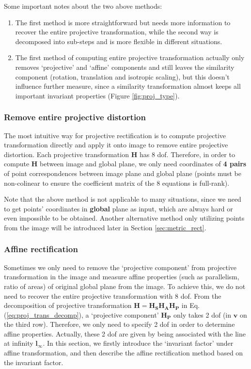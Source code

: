 \documentclass[12pt]{article}
\numberwithin{equation}{section}
\begin{document}
Some important notes about the two above methods:
\begin{enumerate}
\item 
The first method is more straightforward but needs more information to recover the entire projective transformation, while the second way is decomposed into sub-steps and is more flexible in different situations. 
\item
The first method of computing entire projective transformation actually only removes `projective' and `affine' components and still leaves the similarity component (rotation, translation and isotropic scaling), but this doesn't influence further measure, since a similarity transformation almost keeps all important invariant properties (Figure \ref{fig:proj_type}).
\end{enumerate}


\subsubsection{Remove entire projective distortion}
\label{sec:projective_rect}

The most intuitive way for projective rectification is to compute projective transformation directly and apply it onto image to remove entire projective distortion. Each projective transformation $\mathbf{H}$ has 8 dof. Therefore, in order to compute $\mathbf{H}$ between image and global plane, we only need coordinates of \textbf{4 pairs} of point correspondences between image plane and global plane (points must be non-colinear to ensure the coefficient matrix of the 8 equations is full-rank). 

Note that the above method is not applicable to many situations, since we need to get points' coordinates in \textbf{global} plane as input, which are always hard or even impossible to be obtained. Another alternative method only utilizing points from the image will be introduced later in Section \ref{sec:metric_rect}.

\subsubsection{Affine rectification}
\label{sec:affine_rect}

Sometimes we only need to remove the `projective component' from projective transformation in the image and measure affine properties (such as parallelism, ratio of areas) of original global plane from the image. To achieve this, we do not need to recover the entire projective transformation with 8 dof. From the decomposition of projective transformation $\mathbf{H = H_S H_A H_P}$ in Eq. (\ref{eq:proj_trans_decomp}), a `projective component' $\mathbf{H_P}$ only takes 2 dof (in $\mathbf{v}$ on the third row). Therefore, we only need to specify 2 dof in order to determine affine properties. Actually, these 2 dof are given by being associated with the line at infinity $\mathbf{l}_{\infty}$. In this section, we firstly introduce the `invariant factor' under affine transformation, and then describe the affine rectification method based on the invariant factor.
\end{document}
